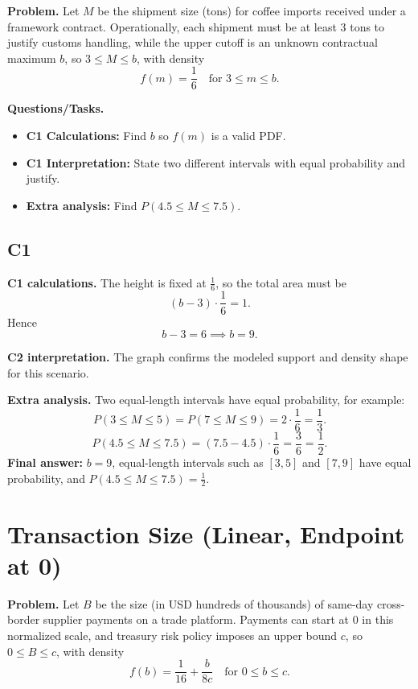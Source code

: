 	\textbf{Problem.}
	Let $M$ be the shipment size (tons) for coffee imports received under a framework contract. Operationally, each shipment must be at least $3$ tons to justify customs handling, while the upper cutoff is an unknown contractual maximum $b$, so $3\le M\le b$, with density
	\[
	f(m)=\frac16\quad\text{for }3\le m\le b.
	\]
	
	\textbf{Questions/Tasks.}
	\begin{itemize}
		\item \textbf{C1 Calculations:} Find $b$ so $f(m)$ is a valid PDF.
		\item \textbf{C1 Interpretation:} State two different intervals with equal probability and justify.
		\item \textbf{Extra analysis:} Find $P(4.5\le M\le 7.5)$.
	\end{itemize}
	
	\subsection*{C1}
	
	\textbf{C1 calculations.}
	The height is fixed at $\frac16$, so the total area must be
	\[
	(b-3)\cdot \frac16=1.
	\]
	Hence
	\[
	b-3=6\implies b=9.
	\]
	
	\textbf{C2 interpretation.}
	The graph confirms the modeled support and density shape for this scenario.
	
	\textbf{Extra analysis.}
	Two equal-length intervals have equal probability, for example:
	\[
	P(3\le M\le5)=P(7\le M\le9)=2\cdot\frac16=\frac13.
	\]
	\[
	P(4.5\le M\le7.5)=(7.5-4.5)\cdot\frac16=\frac{3}{6}=\frac12.
	\]
	\textbf{Final answer:} $b=9$, equal-length intervals such as $[3,5]$ and $[7,9]$ have equal probability, and $P(4.5\le M\le7.5)=\frac12$.
	
\section{Transaction Size (Linear, Endpoint at 0)}

\textbf{Problem.}
Let $B$ be the size (in USD hundreds of thousands) of same-day cross-border supplier payments on a trade platform. Payments can start at $0$ in this normalized scale, and treasury risk policy imposes an upper bound $c$, so $0\le B\le c$, with density
\[
f(b)=\frac{1}{16}+\frac{b}{8c}\quad\text{for }0\le b\le c.
\]

